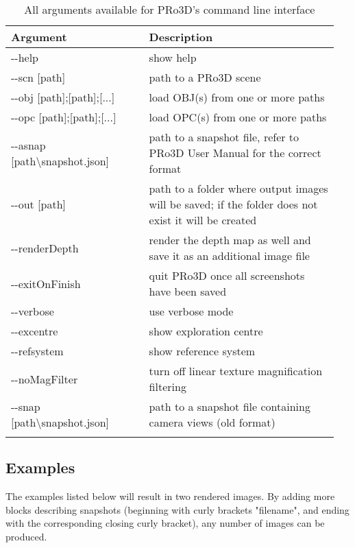  \begin{center}
 	\begin{table}
		\begin{tabular}{p{0.4\linewidth} p{0.55\linewidth} }
			\textbf{Argument}          		 & \textbf{Description} \\
			\midrule
			-{}-help                            &  show help\\
			-{}-scn [path]                      &  path to a PRo3D scene\\
			-{}-obj [path];[path];[...]  &  load OBJ(s) from one or more paths\\
			-{}-opc [path];[path];[...]  &  load OPC(s) from one or more paths\\
			-{}-asnap [path\textbackslash snapshot.json]      &  path to a snapshot file, refer to PRo3D User Manual for the correct format\\
			-{}-out [path]                      &  path to a folder where output images will be saved; if the folder does not exist it will be created\\
			-{}-renderDepth         &              render the depth map as well and save it as an additional image file\\
			-{}-exitOnFinish                    &  quit PRo3D once all screenshots have been saved\\
			-{}-verbose                         &  use verbose mode\\
			-{}-excentre                        &  show exploration centre\\
			-{}-refsystem                       &  show reference system\\
			-{}-noMagFilter                     &  turn off linear texture magnification filtering\\
			-{}-snap [path\textbackslash snapshot.json]       &  path to a snapshot file containing camera views (old format)\\
			\specialrule{\lightrulewidth}{1.0pt}{4.0pt}
		\end{tabular}    
	
	\caption{All arguments available for PRo3D's command line interface} 
	
	\label{table:args} 
	\end{table}
\end{center}

\subsection{Examples} \label{cl:examples}
 The examples listed below will result in two rendered images. By adding more blocks describing snapshots (beginning with curly brackets "filename", and ending with the corresponding closing curly bracket), any number of images can be produced. 

